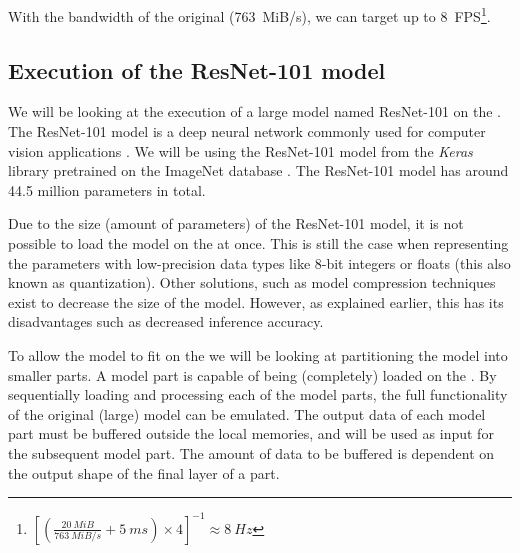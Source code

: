 With the bandwidth of the original \confignoc{} (\SI{763}{MiB/s}), we can target up to \SI{8}{FPS}\footnote{$\left[ \left( \frac{\SI{20}{MiB}}{\SI{763}{MiB/s}} + \SI{5}{ms} \right) \times 4 \right]^{-1} \approx \SI{8}{Hz}$}.

\subsection{Execution of the ResNet-101 model}
We will be looking at the execution of a large model named ResNet-101 on the \graicore{}.
The ResNet-101 model is a deep neural network commonly used for computer vision applications \autocite{heDeepResidualLearning2015}.
We will be using the ResNet-101 model from the \textit{Keras} library \cite{KerasDocumentationResNet} pretrained on the ImageNet database \cite{russakovskyImageNetLargeScale2014}.
The ResNet-101 model has around 44.5 million parameters in total.

Due to the size (amount of parameters) of the ResNet-101 model, it is not possible to load the model on the \graicore{} at once.
This is still the case when representing the parameters with low-precision data types like 8-bit integers or floats (this also known as quantization).
Other solutions, such as model compression techniques exist to decrease the size of the model.
However, as explained earlier, this has its disadvantages such as decreased inference accuracy.

To allow the model to fit on the \graicore{} we will be looking at partitioning the model into smaller parts.
A model part is capable of being (completely) loaded on the \graicore{}.
By sequentially loading and processing each of the model parts, the full functionality of the original (large) model can be emulated.
The output data of each model part must be buffered outside the local memories, and will be used as input for the subsequent model part.
The amount of data to be buffered is dependent on the output shape of the final layer of a part.


